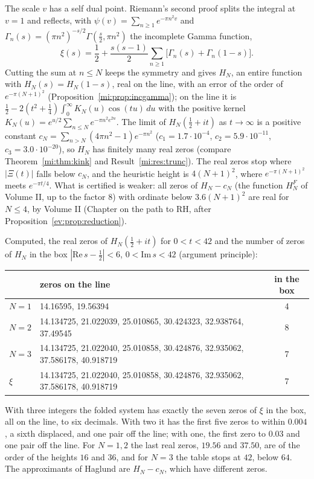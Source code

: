 The scale $v$ has a self dual point. Riemann's second proof splits the integral at $v=1$ and reflects, with $\psi(v)=\sum_{n\ge1}e^{-\pi n^2v}$ and $\Gamma_n(s)=(\pi n^2)^{-s/2}\Gamma(\frac s2,\pi n^2)$ the incomplete Gamma function,
\[
\xi(s)=\frac12+\frac{s(s-1)}2\sum_{n\ge1}\bigl[\Gamma_n(s)+\Gamma_n(1-s)\bigr].
\]
Cutting the sum at $n\le N$ keeps the symmetry and gives $H_N$, an entire function with $H_N(s)=H_N(1-s)$, real on the line, with an error of the order of $e^{-\pi(N+1)^2}$ (Proposition~\ref{mi:prop:incgamma}); on the line it is $\frac12-2(t^2+\frac14)\int_0^\infty K_N(u)\cos(tu)\,du$ with the positive kernel $K_N(u)=e^{u/2}\sum_{n\le N}e^{-\pi n^2e^{2u}}$. The limit of $H_N(\frac12+it)$ as $t\to\infty$ is a positive constant $c_N=\sum_{n>N}(4\pi n^2-1)e^{-\pi n^2}$ ($c_1=1.7\cdot10^{-4}$, $c_2=5.9\cdot10^{-11}$, $c_3=3.0\cdot10^{-20}$), so $H_N$ has finitely many real zeros (compare Theorem~\ref{mi:thm:kink} and Result~\ref{mi:res:trunc}). The real zeros stop where $|\Xi(t)|$ falls below $c_N$, and the heuristic height is $4(N+1)^2$, where $e^{-\pi(N+1)^2}$ meets $e^{-\pi t/4}$. What is certified is weaker: all zeros of $H_N-c_N$ (the function $H^F_N$ of Volume II, up to the factor $8$) with ordinate below $3.6(N+1)^2$ are real for $N\le4$, by Volume II (Chapter on the path to RH, after Proposition~\ref{ev:prop:reduction}).

Computed, the real zeros of $H_N(\frac12+it)$ for $0<t<42$ and the number of zeros of $H_N$ in the box $|\mathrm{Re}\,s-\frac12|<6$, $0<\mathrm{Im}\,s<42$ (argument principle):
\begin{center}
\small
\begin{tabular}{lp{7.3cm}c}
\hline
 & zeros on the line & in the box\\
\hline
$N=1$ & 14.16595, 19.56394 & 4\\
$N=2$ & 14.134725, 21.022039, 25.010865, 30.424323, 32.938764, 37.49545 & 8\\
$N=3$ & 14.134725, 21.022040, 25.010858, 30.424876, 32.935062, 37.586178, 40.918719 & 7\\
$\xi$ & 14.134725, 21.022040, 25.010858, 30.424876, 32.935062, 37.586178, 40.918719 & 7\\
\hline
\end{tabular}
\end{center}
With three integers the folded system has exactly the seven zeros of $\xi$ in the box, all on the line, to six decimals. With two it has the first five zeros to within $0.004$, a sixth displaced, and one pair off the line; with one, the first zero to $0.03$ and one pair off the line. For $N=1,2$ the last real zeros, $19.56$ and $37.50$, are of the order of the heights $16$ and $36$, and for $N=3$ the table stops at $42$, below $64$. The approximants of Haglund \cite{Haglund09} are $H_N-c_N$, which have different zeros.

